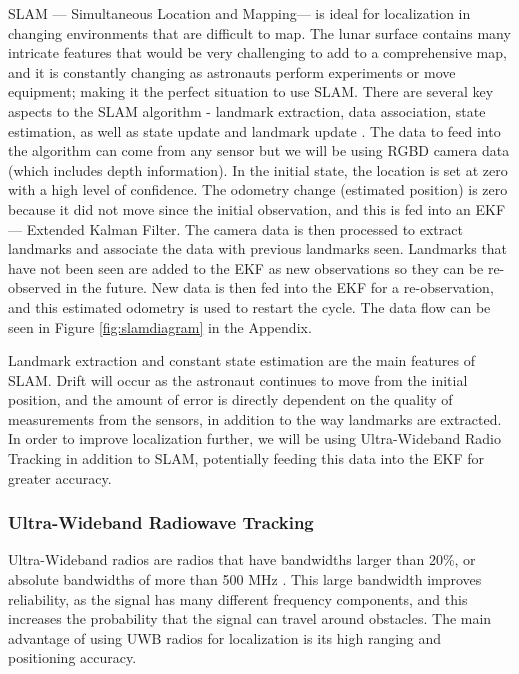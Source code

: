 \documentclass{article}
\let\Oldsubsubsection\subsubsection
\renewcommand{\subsubsection}{\FloatBarrier\Oldsubsubsection}
\begin{document}
SLAM --- Simultaneous Location and Mapping\autocite{slam_riisgaard}--- is ideal for localization in changing environments that are difficult to map. The lunar surface contains many intricate features that would be very challenging to add to a comprehensive map, and it is constantly changing as astronauts perform experiments or move equipment; making it the perfect situation to use SLAM. There are several key aspects to the SLAM algorithm - landmark extraction, data association, state estimation, as well as state update and landmark update \autocite{slam_riisgaard}. The data to feed into the algorithm can come from any sensor but we will be using RGBD camera data (which includes depth information). In the initial state, the location is set at zero with a high level of confidence\autocite{rgbtocad}. The odometry change (estimated position) is zero because it did not move since the initial observation, and this is fed into an EKF --- Extended Kalman Filter. The camera data is then processed to extract landmarks and associate the data with previous landmarks seen. Landmarks that have not been seen are added to the EKF as new observations so they can be re-observed in the future. New data is then fed into the EKF for a re-observation, and this estimated odometry is used to restart the cycle. The data flow can be seen in Figure \ref{fig:slamdiagram} in the Appendix.

Landmark extraction and constant state estimation are the main features of SLAM. Drift will occur as the astronaut continues to move from the initial position, and the amount of error is directly dependent on the quality of measurements from the sensors, in addition to the way landmarks are extracted. In order to improve localization further, we will be using Ultra-Wideband Radio Tracking in addition to SLAM, potentially feeding this data into the EKF for greater accuracy.

\subsubsection{Ultra-Wideband Radiowave Tracking}

Ultra-Wideband radios are radios that have bandwidths larger than 20\%, or absolute bandwidths of more than 500 MHz \autocite{localization}. This large bandwidth improves reliability, as the signal has many different frequency components, and this increases the probability that the signal can travel around obstacles. The main advantage of using UWB radios for localization is its high ranging and positioning accuracy.
\end{document}
